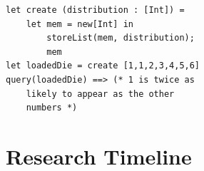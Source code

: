 \documentclass{sig-alternate}
\begin{document}
\begin{lstlisting}[frame=single]
let create (distribution : [Int]) =
    let mem = new[Int] in
        storeList(mem, distribution);
        mem
let loadedDie = create [1,1,2,3,4,5,6]
query(loadedDie) ==> (* 1 is twice as 
    likely to appear as the other 
    numbers *)
\end{lstlisting}
%

\section{Research Timeline}
\label{sec:research_timeline}
\end{document}
